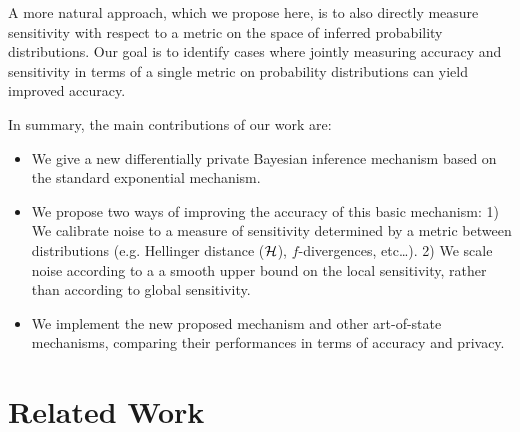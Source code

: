 \documentclass{article}
\begin{document}
A more natural approach, which we propose here, is to also directly measure sensitivity with respect
to a metric on the space of inferred probability distributions. Our goal is to identify cases where jointly measuring
accuracy and sensitivity in terms of a single metric on probability distributions can yield improved accuracy. 
{\color{red}{MB: Is this accurate? Would we ever want to use different metrics for accuracy and sensitivity?}}





In summary, the main contributions of our work are:
\begin{itemize}
	\item We give a new differentially private Bayesian inference mechanism based on the standard exponential mechanism.
	\item We propose two ways of improving the accuracy of this basic mechanism: 1) We calibrate noise to a measure of sensitivity determined by a metric between distributions
      (e.g. Hellinger distance ($\mathcal{H}$), $f$-divergences, etc\dots). 2) We scale noise according to a a smooth upper bound on the local sensitivity, rather than according to global sensitivity.
  \item We implement the new proposed mechanism and other art-of-state mechanisms, comparing their performances in terms of accuracy and privacy.
\end{itemize}

\section{Related Work}
\end{document}
